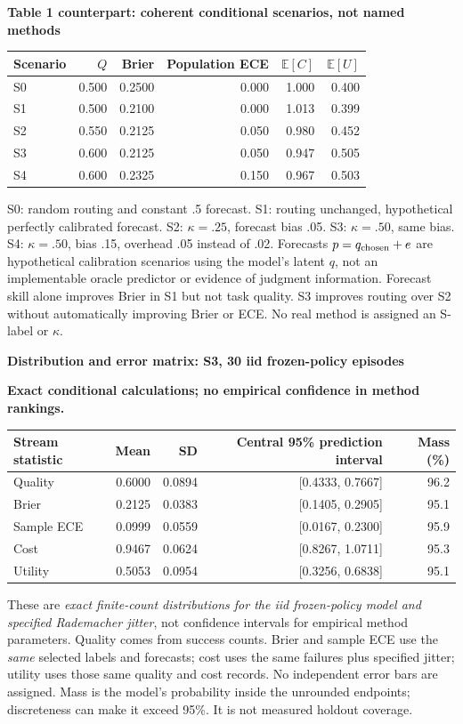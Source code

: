 \documentclass[10pt,a4paper]{article}
\newcommand{\lead}[1]{\vspace{3pt}\textbf{#1}\par}
\newcommand{\status}{\textcolor{red!70!black}{\textbf{Exact conditional calculations; no empirical confidence in method rankings.}}\par}
\begin{document}
\lead{Table 1 counterpart: coherent conditional scenarios, not named methods}
\begin{center}\small
\begin{tabular*}{\linewidth}{@{\extracolsep{\fill}}lrrrrr@{}}\toprule
Scenario & $Q$ & Brier & Population ECE & $\mathbb E[C]$ & $\mathbb E[U]$\\\midrule
S0 & 0.500 & 0.2500 & 0.000 & 1.000 & 0.400\\
S1 & 0.500 & 0.2100 & 0.000 & 1.013 & 0.399\\
S2 & 0.550 & 0.2125 & 0.050 & 0.980 & 0.452\\
S3 & 0.600 & 0.2125 & 0.050 & 0.947 & 0.505\\
S4 & 0.600 & 0.2325 & 0.150 & 0.967 & 0.503\\
\bottomrule\end{tabular*}\end{center}
S0: random routing and constant .5 forecast. S1: routing unchanged, hypothetical
perfectly calibrated forecast. S2: $\kappa=.25$, forecast bias .05. S3:
$\kappa=.50$, same bias. S4: $\kappa=.50$, bias .15, overhead .05 instead of .02.
Forecasts $p=q_{\rm chosen}+e$ are hypothetical calibration scenarios using the
model's latent $q$, not an implementable oracle predictor or evidence of judgment
information. Forecast skill alone improves Brier in S1 but not task quality.
S3 improves routing over S2 without automatically improving Brier or ECE.
No real method is assigned an S-label or $\kappa$.

\clearpage
\lead{Distribution and error matrix: S3, 30 iid frozen-policy episodes}\status
\begin{center}\small
\begin{tabular*}{\linewidth}{@{\extracolsep{\fill}}lrrrr@{}}\toprule
Stream statistic & Mean & SD & Central 95\% prediction interval & Mass (\%)\\\midrule
Quality & 0.6000 & 0.0894 & [0.4333, 0.7667] & 96.2\\
Brier & 0.2125 & 0.0383 & [0.1405, 0.2905] & 95.1\\
Sample ECE & 0.0999 & 0.0559 & [0.0167, 0.2300] & 95.9\\
Cost & 0.9467 & 0.0624 & [0.8267, 1.0711] & 95.3\\
Utility & 0.5053 & 0.0954 & [0.3256, 0.6838] & 95.1\\
\bottomrule\end{tabular*}\end{center}
These are \emph{exact finite-count distributions for the iid frozen-policy model
and specified Rademacher jitter}, not
confidence intervals for empirical method parameters. Quality comes from
success counts. Brier and sample ECE use the \emph{same} selected labels and
forecasts; cost uses the same failures plus specified jitter; utility uses
those same quality and cost records. No independent error bars are assigned.
Mass is the model's probability inside the unrounded endpoints; discreteness
can make it exceed 95\%. It is not measured holdout coverage.
\end{document}
